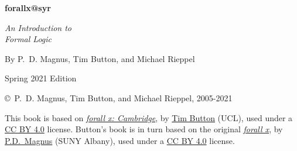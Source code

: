 \thispagestyle{empty}


    
\vspace{20pt}
    
\begin{center}
\fontsize{36pt}{36pt}\selectfont
  \textbf{forallx@syr}

\fontsize{24pt}{24pt}\selectfont
\vspace{1em}
\textit{An Introduction to\\ Formal Logic}


\vspace{40pt}

\fontsize{16pt}{18pt}\selectfont By P.~D. Magnus, Tim Button, and Michael Rieppel\\

\vspace{85pt}

\fontsize{20pt}{20pt}\selectfont
Spring 2021 Edition
\end{center}

\newpage


\noindent \small \copyright \ P.~D. Magnus, Tim Button, and Michael Rieppel, 2005-2021

\vspace{1ex}

\noindent This book is based on \href{http://www.homepages.ucl.ac.uk/~uctytbu/forallxcam.pdf}{\emph{forall x: Cambridge}}, by  \href{http://www.homepages.ucl.ac.uk/~uctytbu}{Tim Button}
(UCL), used under a \href{https://creativecommons.org/licenses/by/4.0/}{CC BY 4.0} license.  Button's book is in turn based on the original \href{https://www.fecundity.com/logic/}{\emph{forall x}}, by
\href{https://www.fecundity.com/job/}{P.D.\ Magnus} (SUNY Albany), used under a \href{https://creativecommons.org/licenses/by/4.0/}{CC BY 4.0} license.

